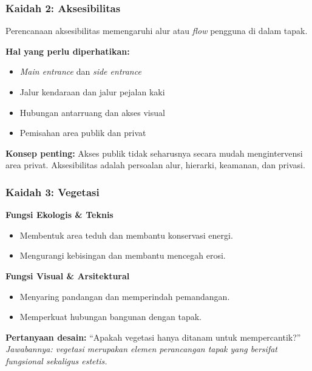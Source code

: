\documentclass[../main.tex]{subfiles}
\begin{document}
\begin{frame}[mytitle=standard, t, mycolor=digiPH_gray, light]
	\frametitle{Kaidah 2: Aksesibilitas}

	Perencanaan aksesibilitas memengaruhi alur atau \textit{flow} pengguna di dalam tapak.

	\vspace{0.3cm}
	\textbf{Hal yang perlu diperhatikan:}
	\begin{itemize}
		\item \textit{Main entrance} dan \textit{side entrance}
		\item Jalur kendaraan dan jalur pejalan kaki
		\item Hubungan antarruang dan akses visual
		\item Pemisahan area publik dan privat
	\end{itemize}

	\vspace{0.3cm}
	\textbf{Konsep penting:} Akses publik tidak seharusnya secara mudah mengintervensi area privat. Aksesibilitas adalah persoalan alur, hierarki, keamanan, dan privasi.
\end{frame}

\begin{frame}[mytitle=standard, t, mycolor=digiPH_white, light]
	\frametitle{Kaidah 3: Vegetasi}

	\textbf{Fungsi Ekologis \& Teknis}
	\begin{itemize}
		\item Membentuk area teduh dan membantu konservasi energi.
		\item Mengurangi kebisingan dan membantu mencegah erosi.
	\end{itemize}

	\vspace{0.3cm}
	\textbf{Fungsi Visual \& Arsitektural}
	\begin{itemize}
		\item Menyaring pandangan dan memperindah pemandangan.
		\item Memperkuat hubungan bangunan dengan tapak.
	\end{itemize}

	\vspace{0.3cm}
	\textbf{Pertanyaan desain:} ``Apakah vegetasi hanya ditanam untuk mempercantik?'' \\
	\textit{Jawabannya: vegetasi merupakan elemen perancangan tapak yang bersifat fungsional sekaligus estetis.}
\end{frame}
\end{document}
